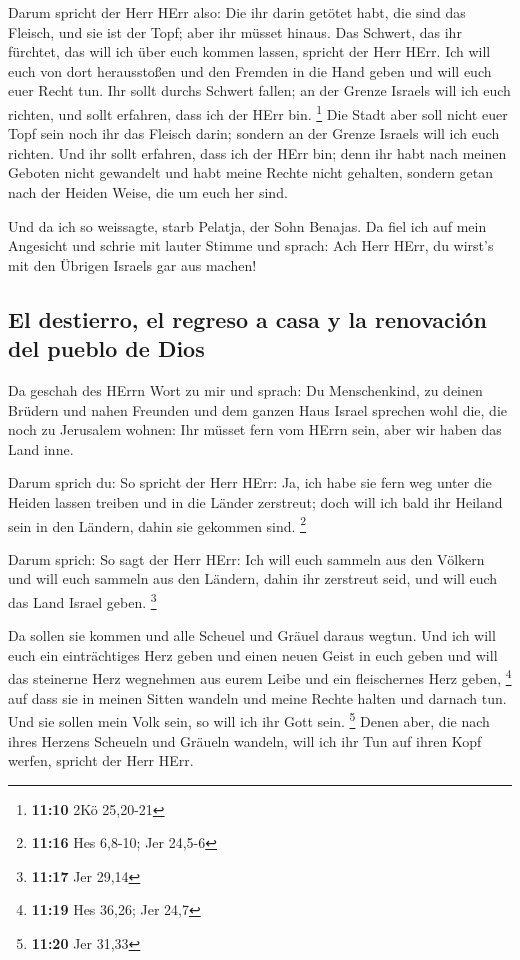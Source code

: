  Darum spricht der Herr HErr also: Die ihr darin getötet
habt, die sind das Fleisch, und sie ist der Topf; aber ihr müsset
hinaus.  Das Schwert, das ihr fürchtet, das will ich über
euch kommen lassen, spricht der Herr HErr.  Ich will euch
von dort herausstoßen und den Fremden in die Hand geben und will euch
euer Recht tun.  Ihr sollt durchs Schwert fallen; an der
Grenze Israels will ich euch richten, und sollt erfahren, dass ich der
HErr bin. \footnote{\textbf{11:10} 2Kö 25,20-21}  Die
Stadt aber soll nicht euer Topf sein noch ihr das Fleisch darin; sondern
an der Grenze Israels will ich euch richten.  Und ihr
sollt erfahren, dass ich der HErr bin; denn ihr habt nach meinen Geboten
nicht gewandelt und habt meine Rechte nicht gehalten, sondern getan nach
der Heiden Weise, die um euch her sind.

 Und da ich so weissagte, starb Pelatja, der Sohn
Benajas. Da fiel ich auf mein Angesicht und schrie mit lauter Stimme und
sprach: Ach Herr HErr, du wirst's mit den Übrigen Israels gar aus
machen!

\hypertarget{el-destierro-el-regreso-a-casa-y-la-renovaciuxf3n-del-pueblo-de-dios}{%
\subsection{El destierro, el regreso a casa y la renovación del pueblo
de
Dios}\label{el-destierro-el-regreso-a-casa-y-la-renovaciuxf3n-del-pueblo-de-dios}}

 Da geschah des HErrn Wort zu mir und sprach:
 Du Menschenkind, zu deinen Brüdern und nahen Freunden
und dem ganzen Haus Israel sprechen wohl die, die noch zu Jerusalem
wohnen: Ihr müsset fern vom HErrn sein, aber wir haben das Land inne.

 Darum sprich du: So spricht der Herr HErr: Ja, ich habe
sie fern weg unter die Heiden lassen treiben und in die Länder
zerstreut; doch will ich bald ihr Heiland sein in den Ländern, dahin sie
gekommen sind. \footnote{\textbf{11:16} Hes 6,8-10; Jer 24,5-6}

 Darum sprich: So sagt der Herr HErr: Ich will euch
sammeln aus den Völkern und will euch sammeln aus den Ländern, dahin ihr
zerstreut seid, und will euch das Land Israel geben. \footnote{\textbf{11:17}
  Jer 29,14}

 Da sollen sie kommen und alle Scheuel und Gräuel daraus
wegtun.  Und ich will euch ein einträchtiges Herz geben
und einen neuen Geist in euch geben und will das steinerne Herz
wegnehmen aus eurem Leibe und ein fleischernes Herz geben, \footnote{\textbf{11:19}
  Hes 36,26; Jer 24,7}  auf dass sie in meinen Sitten
wandeln und meine Rechte halten und darnach tun. Und sie sollen mein
Volk sein, so will ich ihr Gott sein. \footnote{\textbf{11:20} Jer 31,33}
 Denen aber, die nach ihres Herzens Scheueln und Gräueln
wandeln, will ich ihr Tun auf ihren Kopf werfen, spricht der Herr HErr.

